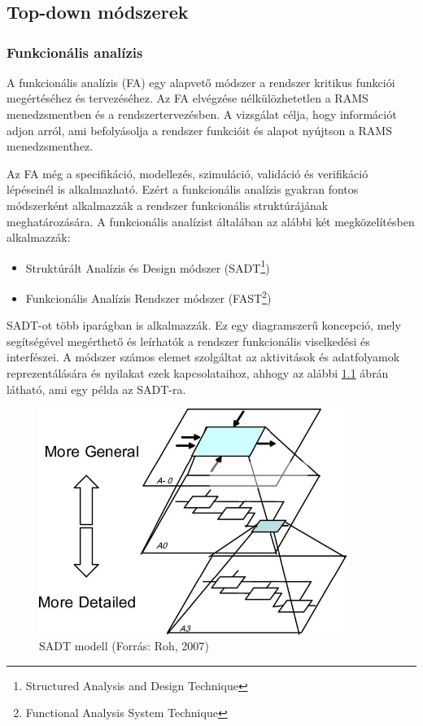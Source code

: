 \chapter{\analysis}

\section{Top-down módszerek}
\subsection{Funkcionális analízis}
A funkcionális analízis (FA) egy alapvető módszer a rendszer kritikus funkciói megértéséhez és tervezéséhez.
Az FA elvégzése nélkülözhetetlen a RAMS menedzsmentben és a rendszertervezésben.
A vizsgálat célja, hogy információt adjon arról, ami befolyásolja a rendszer funkcióit és alapot nyújtson a RAMS menedzsmenthez.

Az FA még a specifikáció, modellezés, szimuláció, validáció és verifikáció lépéseinél is alkalmazható.
Ezért a funkcionális analízis gyakran fontos módszerként alkalmazzák a rendszer funkcionális struktúrájának meghatározására.
A funkcionális analízist általában az alábbi két megközelítésben alkalmazzák:
\begin{itemize}
    \item Struktúrált Analízis és Design módszer (SADT\footnote{Structured Analysis and Design Technique})
    \item Funkcionális Analízis Rendszer módszer (FAST\footnote{Functional Analysis System Technique})
\end{itemize}
SADT-ot több iparágban is alkalmazzák. 
Ez egy diagramszerű koncepció, mely segítségével megérthető és leírhatók a rendszer funkcionális viselkedési és interfészei.
A módszer számos elemet szolgáltat az aktivitások és adatfolyamok reprezentálására és nyilakat ezek kapcsolataihoz, ahhogy az alábbi \ref{fig:sadt} ábrán látható, ami egy példa az SADT-ra.

\begin{figure}
    \footnotesize
    \centering
    \includegraphics[width=100mm, keepaspectratio]{figures/roh2007.jpg}
    \caption{SADT modell (Forrás: Roh, 2007\cite{doi:10.1080/13675560701478240})}
    \label{fig:sadt}
\end{figure}

